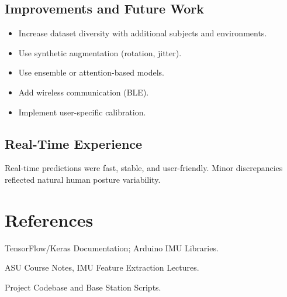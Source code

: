 \documentclass[12pt]{article}
\begin{document}
\subsection*{Improvements and Future Work}
\begin{itemize}
    \item Increase dataset diversity with additional subjects and environments.
    \item Use synthetic augmentation (rotation, jitter).
    \item Use ensemble or attention-based models.
    \item Add wireless communication (BLE).
    \item Implement user-specific calibration.
\end{itemize}

\subsection*{Real-Time Experience}
Real-time predictions were fast, stable, and user-friendly. Minor discrepancies reflected natural human posture variability.

\section*{References}

\begin{enumerate}[label={[\arabic*]}]
    \item \label{ref1} TensorFlow/Keras Documentation; Arduino IMU Libraries.
    \item \label{ref2} ASU Course Notes, IMU Feature Extraction Lectures.
    \item \label{ref3} Project Codebase and Base Station Scripts.
\end{enumerate}
\end{document}
